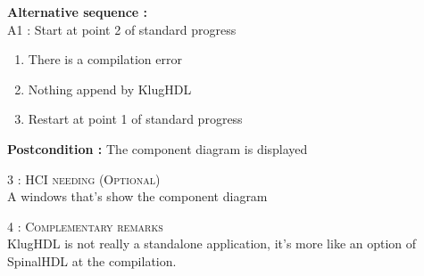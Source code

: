 \begin{flushleft}
    \textbf{\large  Alternative sequence :}\\
    A1 : Start at point 2 of standard progress
    \begin{enumerate}[nosep]
        \item There is a compilation error
        \item Nothing append by KlugHDL
        \item Restart at point 1 of standard progress
    \end{enumerate}

    \textbf{\large Postcondition :} The component diagram is displayed

    \BlackLine
    \textsc{\Large 3 : HCI needing (Optional)}\\[0.3cm]

    A windows that's show the component diagram

    \BlackLine
    \textsc{\Large 4 : Complementary remarks}\\[0.3cm]

    KlugHDL is not really a standalone application, it's more like an option of SpinalHDL at the compilation.

\end{flushleft}
